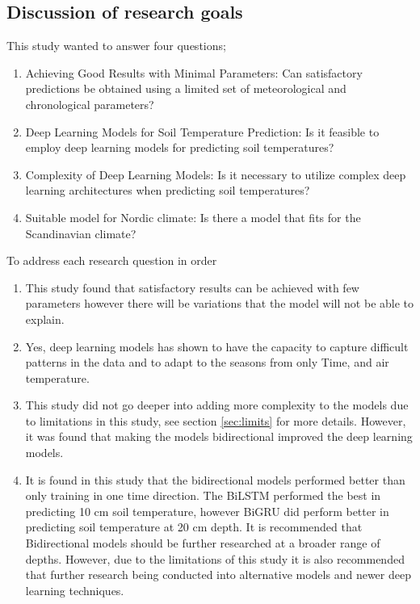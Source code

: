 \subsection{Discussion of research goals}

This study wanted to answer four questions;
\begin{enumerate}
	\item Achieving Good Results with Minimal Parameters: Can satisfactory predictions be obtained using a limited set of meteorological and chronological parameters?
	
	\item Deep Learning Models for Soil Temperature Prediction: Is it feasible to employ deep learning models for predicting soil temperatures?
	
	\item Complexity of Deep Learning Models: Is it necessary to utilize complex deep learning architectures when predicting soil temperatures?
	
	\item Suitable model for Nordic climate: Is there a model that fits for the Scandinavian climate?
\end{enumerate}

To address each research question in order
\begin{enumerate}
	\item This study found that satisfactory results can be achieved with few parameters however there will be variations that the model will not be able to explain.
	\item Yes, deep learning models has shown to have the capacity to capture difficult patterns in the data and to adapt to the seasons from only Time, and air temperature.
	\item This study did not go deeper into adding more complexity to the models due to limitations in this study, see section \ref{sec:limits} for more details. However, it was found that making the models bidirectional improved the deep learning models.
	\item It is found in this study that the bidirectional models performed better than only training in one time direction. The BiLSTM performed the best in predicting 10 cm soil temperature, however BiGRU did perform better in predicting soil temperature at 20 cm depth. It is recommended that Bidirectional models should be further researched at a broader range of depths. However, due to the limitations of this study it is also recommended that further research being conducted into alternative models and newer deep learning techniques.
\end{enumerate}


